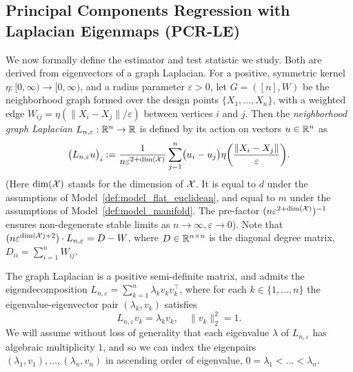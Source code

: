 \subsection{Principal Components Regression with Laplacian Eigenmaps (PCR-LE)}
\label{subsec:laplacian_eigenmaps}
We now formally define the estimator and test statistic we study. Both are derived from eigenvectors of a graph Laplacian.  For a positive, symmetric kernel $\eta: [0,\infty) \to [0,\infty)$, and a radius parameter $\varepsilon > 0$, let $G = ([n],W)$ be the neighborhood graph formed over the design points $\{X_1,\ldots,X_n\}$, with a weighted edge $W_{ij} = \eta(\|X_i - X_j\|/\varepsilon)$ between vertices $i$ and $j$. Then the 
\emph{neighborhood graph Laplacian} $L_{n,\varepsilon}: \mathbb{R}^n \to \mathbb{R}$ is defined by its action on vectors $u \in \mathbb{R}^n$ as
\begin{equation}
\label{eqn:neighborhood_graph_laplacian}
\bigl(L_{n,\varepsilon}u\bigr)_i := \frac{1}{n\varepsilon^{2 + \mathrm{dim}(\mathcal{X})}} \sum_{j = 1}^{n} \bigl(u_i - u_j\bigr) \eta\biggl(\frac{\|X_i - X_j\|}{\varepsilon}\biggr).
\end{equation}
(Here $\mathrm{dim}(\mathcal{X})$ stands for the dimension of $\mathcal{X}$. It is equal to $d$ under the assumptions of Model~\ref{def:model_flat_euclidean}, and equal to $m$ under the assumptions of Model~\ref{def:model_manifold}. The pre-factor $(n\varepsilon^{2 + \mathrm{dim}(\mathcal{X})})^{-1}$ ensures non-degenerate stable limits as $n \to \infty, \varepsilon \to 0$). Note that $(n\varepsilon^{\dim(\mathcal{X}) + 2}) \cdot L_{n,\varepsilon} = D - W$, where $D \in \mathbb{R}^{n \times n}$ is the diagonal degree matrix, $D_{ii} = \sum_{i = 1}^{n} W_{ij}$.

The graph Laplacian is a positive semi-definite matrix, and admits the eigendecomposition $L_{n,\varepsilon} = \sum_{k = 1}^{n} \lambda_k v_k v_k^{\top}$, where for each $k \in \{1,\ldots,n\}$ the eigenvalue-eigenvector pair $(\lambda_k,v_k)$ satisfies
\begin{equation*}
L_{n,\varepsilon}v_k = \lambda_k v_k, \quad \|v_k\|_2^2 = 1.
\end{equation*}
We will assume without loss of generality that each eigenvalue $\lambda$ of $L_{n,\varepsilon}$ has algebraic multiplicity $1$, and so we can index the eigenpairs $(\lambda_1,v_1),\ldots,(\lambda_n,v_n)$ in ascending order of eigenvalue, $0 = \lambda_1 < \ldots < \lambda_n$. 

